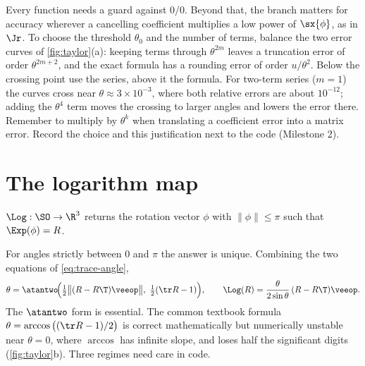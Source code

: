 \begin{keyidea}
Every function needs a guard against $0/0$. Beyond that, the branch matters for accuracy wherever a
cancelling coefficient multiplies a low power of $\sx{\phi}$, as in $\Jr$. To choose the threshold
$\theta_0$ and the number of terms, balance the two error curves of \cref{fig:taylor}(a): keeping terms
through $\theta^{2m}$ leaves a truncation error of order $\theta^{2m+2}$, and the exact formula has a
rounding error of order $u/\theta^2$. Below the crossing point use the series, above it the formula.
For two-term series ($m = 1$) the curves cross near $\theta \approx 3\times10^{-3}$, where both relative
errors are about $10^{-12}$; adding the $\theta^4$ term moves the crossing to larger angles and lowers
the error there. Remember to multiply by $\theta^k$ when translating a coefficient error into a matrix
error. Record the choice and this justification next to the code (Milestone 2).
\end{keyidea}

\section{The logarithm map}
\label{sec:log}

\begin{definition}
$\Log: \SO \to \R^3$ returns the rotation vector $\phi$ with $\|\phi\| \le \pi$ such that
$\Exp(\phi) = R$.
\end{definition}

For angles strictly between $0$ and $\pi$ the answer is unique. Combining the two equations of
\eqref{eq:trace-angle},
\begin{equation}
  \theta = \atantwo\!\Big( \tfrac12\big\|(R - R\T)\veeop\big\|,\ \tfrac12(\tr R - 1) \Big), \qquad
  \Log(R) = \frac{\theta}{2\sin\theta}\,(R - R\T)\veeop .
  \label{eq:Log}
\end{equation}
The $\atantwo$ form is essential. The common textbook formula $\theta = \arccos\big((\tr R - 1)/2\big)$ is
correct mathematically but numerically unstable near $\theta = 0$, where $\arccos$ has infinite slope,
and loses half the significant digits (\cref{fig:taylor}b). Three regimes need care in code.

